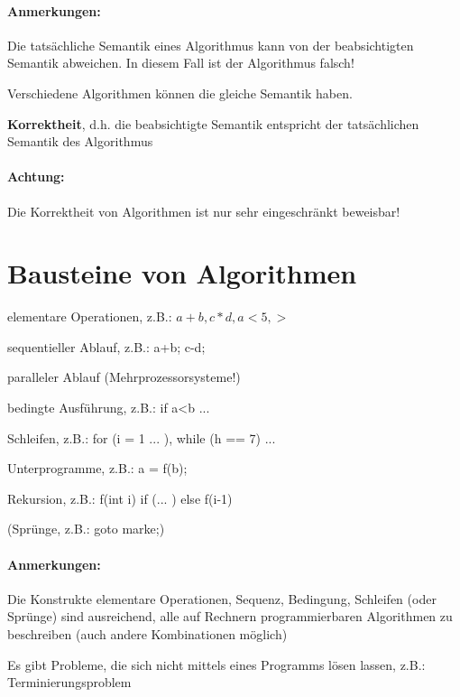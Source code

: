 \begin{compactitem}
	\paragraph{Anmerkungen:}
	\begin{compactenum}
		\item Die tatsächliche Semantik eines Algorithmus kann von der beabsichtigten Semantik abweichen. In diesem Fall ist der Algorithmus falsch!
		\item Verschiedene Algorithmen können die gleiche Semantik haben.
	\end{compactenum}
	\item {\bf Korrektheit}, d.h. die beabsichtigte Semantik entspricht der tatsächlichen Semantik des Algorithmus\\
	\paragraph{Achtung:} Die Korrektheit von Algorithmen ist nur sehr eingeschränkt beweisbar!
\end{compactitem}

\section{Bausteine von Algorithmen}
\begin{compactitem}
	\item elementare Operationen, z.B.: $a+b, c*d, a<5, >$
	\item sequentieller Ablauf, z.B.: a+b; c-d;
	\item paralleler Ablauf (Mehrprozessorsysteme!)
	\item bedingte Ausführung, z.B.: if a<b ...
	\item Schleifen, z.B.: for (i = 1 ... ), while (h == 7) ...
	\item Unterprogramme, z.B.: a = f(b);
	\item Rekursion, z.B.: f(int i) { if (... ) else f(i-1) }
	\item (Sprünge, z.B.: goto marke;)
\end{compactitem}

\paragraph{Anmerkungen:}
\begin{compactenum}
	\item Die Konstrukte elementare Operationen, Sequenz, Bedingung, Schleifen (oder Sprünge) sind ausreichend, alle auf Rechnern programmierbaren Algorithmen zu beschreiben (auch andere Kombinationen möglich)
	\item Es gibt Probleme, die sich nicht mittels eines Programms lösen lassen, z.B.: Terminierungsproblem
\end{compactenum}

